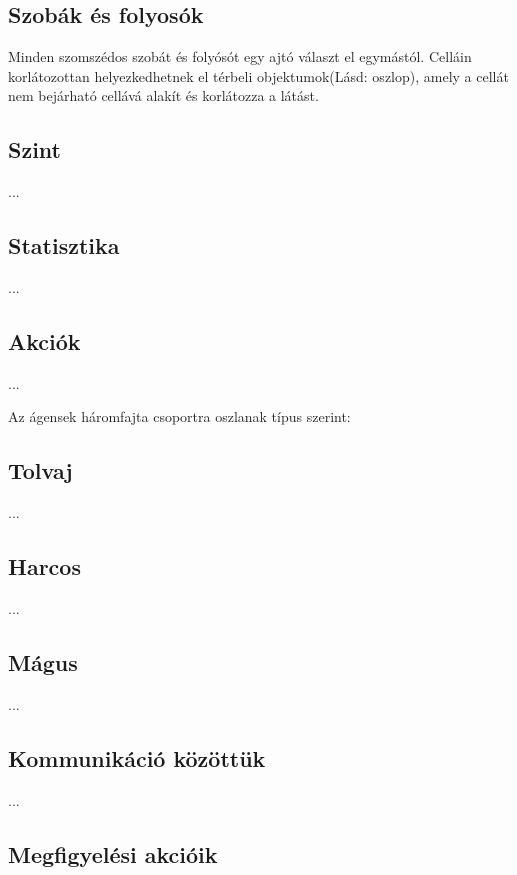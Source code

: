 \subsection{Szobák és folyosók}

Minden szomszédos szobát és folyósót egy ajtó választ el egymástól.
Celláin korlátozottan helyezkedhetnek el térbeli objektumok(Lásd: oszlop), amely a cellát nem bejárható cellává alakít és korlátozza a látást.


\subsection{Szint}

...

\subsection{Statisztika}

...

\subsection{Akciók}

...


Az ágensek háromfajta csoportra oszlanak típus szerint:

\subsection{Tolvaj}

...

\subsection{Harcos}

...

\subsection{Mágus}

...

\subsection{Kommunikáció közöttük}

...

\subsection{Megfigyelési akcióik}

